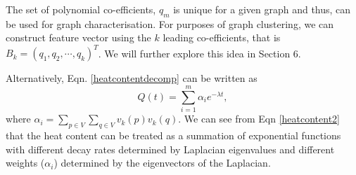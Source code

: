 \documentclass[10pt,a4paper]{article}
\theoremstyle{plain}
\theoremstyle{definition}
\begin{document}
    The set of polynomial co-efficients, $q_m$ is unique for a given graph and thus, can be used for graph characterisation. For purposes of graph clustering, we can construct feature vector using the $k$ leading co-efficients, that is $B_k = (q_1,q_2,\cdots,q_k)^T$. We will further explore this idea in Section 6.
    
    Alternatively, Eqn. \ref{heatcontentdecomp} can be written as
    \begin{equation}
      Q(t) = \sum_{i=1}^{m} \alpha_i e^{-\lambda t},
      \label{heatcontent2}
    \end{equation}
    where $\alpha_i = \sum_{p \in V} \sum_{q \in V}  v_{k}(p) v_{k}(q) $.
    We can see from Eqn \ref{heatcontent2} that the heat content can be treated as a summation of exponential functions with different decay rates determined by Laplacian eigenvalues and different weights ($\alpha_i$) determined by the eigenvectors of the Laplacian. 
\end{document}
